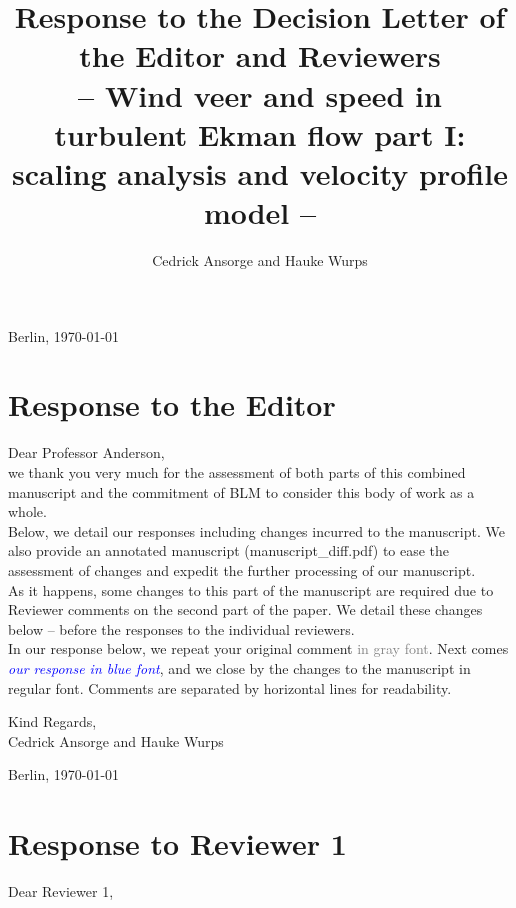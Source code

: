 \documentclass[a4paper,10pt]{article}
\title{Response to the Decision Letter of the Editor and Reviewers\\
\normalsize -- Wind veer and speed in turbulent Ekman flow part I: scaling analysis and velocity profile model -- }
\author{Cedrick Ansorge and Hauke Wurps }
\newcommand{\explainformat}{\noindent In our response below, we repeat your original comment \textcolor{gray}{in gray font}. Next comes \textcolor{blue}{\textit{our response in blue font}}, and we close by the changes to the manuscript in regular font. Comments are separated by horizontal lines for readability.\\[1em]}
\begin{document}
\maketitle
\tableofcontents 
\newpage 

\begin{flushright}{Berlin, \today}\\ \end{flushright}
\section{Response to the Editor} 
\noindent Dear Professor Anderson, \\[1em]

\noindent we thank you very much for the assessment of both parts of this combined manuscript and the commitment of BLM to consider this body of work as a whole. \\[1em]

\noindent Below, we detail our responses including changes incurred to the manuscript. We also provide an annotated manuscript (manuscript\_diff.pdf) to ease the assessment of changes and expedit the further processing of our manuscript. \\[1em]

\noindent As it happens, some changes to this part of the manuscript are required due to Reviewer comments on the second part of the paper. We detail these changes below -- before the responses to the individual reviewers. \\[1em]

\explainformat{}

\noindent Kind Regards, \\
\noindent Cedrick Ansorge and Hauke Wurps 

\newpage 
\begin{flushright}{Berlin, \today}\\ \end{flushright}
\section{Response to Reviewer 1}

Dear Reviewer 1, \\[1em]
\end{document}
